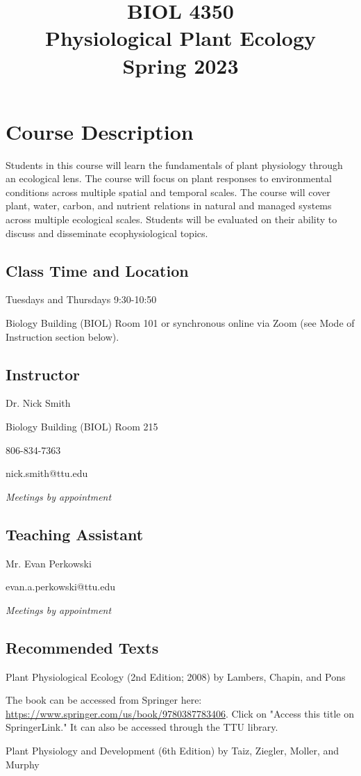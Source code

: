 \documentclass[12pt, notitlepage]{article}   	%
\title{
	\textbf{
		BIOL 4350
	} \\
	\large Physiological Plant Ecology \\
	\large Spring 2023
}
\date{\vspace{-5ex}}
\begin{document}
{\selectfont %

\maketitle

\section{Course Description}
Students in this course will learn the fundamentals of plant physiology through 
an ecological lens. The course will focus on plant responses to environmental conditions 
across multiple spatial and temporal scales. The course will cover plant, water, carbon, 
and nutrient relations in natural and managed systems across multiple ecological scales. 
Students will be evaluated on their 
ability to discuss and disseminate ecophysiological topics.

\subsection{Class Time and Location}
Tuesdays and Thursdays 9:30-10:50

Biology Building (BIOL) Room 101 or 
synchronous online via Zoom (see Mode of Instruction section below).

\subsection{Instructor}
Dr. Nick Smith \par
Biology Building (BIOL) Room 215 \par
806-834-7363 \par
nick.smith@ttu.edu \par
\textit{Meetings by appointment}

\subsection{Teaching Assistant}
Mr. Evan Perkowski \par
evan.a.perkowski@ttu.edu \par
\textit{Meetings by appointment}

\subsection{Recommended Texts}
Plant Physiological Ecology (2nd Edition; 2008) by Lambers, Chapin, and Pons \par
The book can be accessed from Springer here: 
\url{https://www.springer.com/us/book/9780387783406}. Click on "Access this title on 
SpringerLink." It can also be accessed through the TTU library. \par
Plant Physiology and Development (6th Edition) by Taiz, Ziegler, Moller, and Murphy

}
\end{document}
